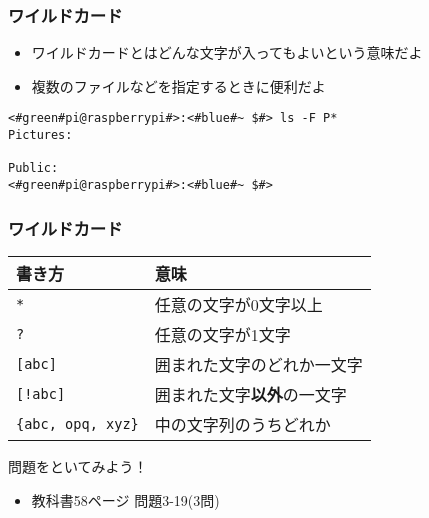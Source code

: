 \begin{frame}[fragile]
    \frametitle{ワイルドカード}
    \begin{itemize}
        \item ワイルドカードとはどんな文字が入ってもよいという意味だよ
        \item 複数のファイルなどを指定するときに便利だよ
    \end{itemize}
    \begin{lstlisting}[title=ワイルドカードの使い方の例]
<#green#pi@raspberrypi#>:<#blue#~ $#> ls -F P*
Pictures:
            
Public:
<#green#pi@raspberrypi#>:<#blue#~ $#>
    \end{lstlisting}
\end{frame}

\begin{frame}
    \frametitle{ワイルドカード}
    \begin{tabular}{ll} \hline
        書き方 & 意味 \\ \hline
        \texttt{*} & 任意の文字が0文字以上 \\
        \texttt{?}      & 任意の文字が1文字 \\
        \texttt{[abc]}  & 囲まれた文字のどれか一文字\\
        \texttt{[!abc]} & 囲まれた文字{\bf 以外}の一文字\\
        \texttt{\{abc, opq, xyz\}} & 中の文字列のうちどれか\\ \hline
    \end{tabular}
\end{frame}

\begin{frame}
    \begin{exampleblock}{問題をといてみよう！}
        \begin{itemize}
            \item 教科書58ページ 問題3-19(3問)
        \end{itemize}
    \end{exampleblock} 
\end{frame}

